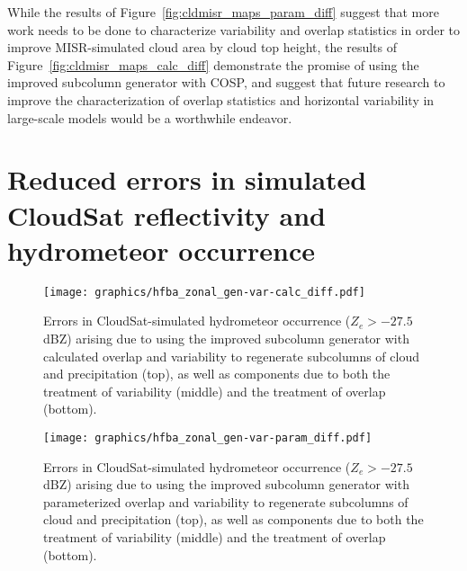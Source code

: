 While the results of Figure~\ref{fig:cldmisr_maps_param_diff} suggest
that more work needs to be done to characterize variability and overlap
statistics in order to improve MISR-simulated cloud area by cloud top
height, the results of Figure~\ref{fig:cldmisr_maps_calc_diff}
demonstrate the promise of using the improved subcolumn generator with
COSP, and suggest that future research to improve the characterization
of overlap statistics and horizontal variability in large-scale models
would be a worthwhile endeavor.

\section{Reduced errors in simulated CloudSat reflectivity and
hydrometeor occurrence}\label{sec:subgrid2Active}

\begin{figure}[tp]
\centering
\texttt{[image: graphics/hfba\_zonal\_gen-var-calc\_diff.pdf]}
\caption{\label{fig:hfba_zonal_calc_diff}Errors in CloudSat-simulated
hydrometeor occurrence (\(Z_e > -27.5\) dBZ) arising due to using the
improved subcolumn generator with calculated overlap and variability to
regenerate subcolumns of cloud and precipitation (top), as well as
components due to both the treatment of variability (middle) and the
treatment of overlap (bottom).}\label{fig:hfbaux5fzonalux5fcalcux5fdiff}
\end{figure}

\begin{figure}[tp]
\centering
\texttt{[image: graphics/hfba\_zonal\_gen-var-param\_diff.pdf]}
\caption{\label{fig:hfba_zonal_param_diff}Errors in CloudSat-simulated
hydrometeor occurrence (\(Z_e > -27.5\) dBZ) arising due to using the
improved subcolumn generator with parameterized overlap and variability
to regenerate subcolumns of cloud and precipitation (top), as well as
components due to both the treatment of variability (middle) and the
treatment of overlap
(bottom).}\label{fig:hfbaux5fzonalux5fparamux5fdiff}
\end{figure}

